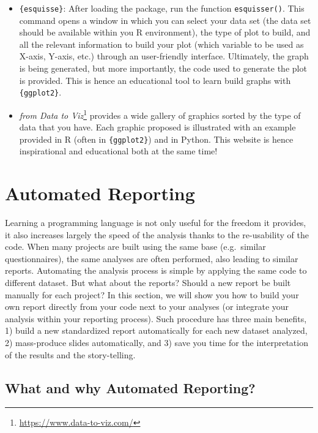\documentclass[
]{krantz}
\providecommand{\tightlist}{%
  \setlength{\itemsep}{0pt}\setlength{\parskip}{0pt}}
\renewenvironment{quote}{\begin{VF}}{\end{VF}}
\renewcommand{\href}[2]{#2\footnote{\url{#1}}}
\begin{document}
\begin{itemize}
\tightlist
\item
  \texttt{\{esquisse\}}: After loading the package, run the function \texttt{esquisser()}. This command opens a window in which you can select your data set (the data set should be available within you R environment), the type of plot to build, and all the relevant information to build your plot (which variable to be used as X-axis, Y-axis, etc.) through an user-friendly interface. Ultimately, the graph is being generated, but more importantly, the code used to generate the plot is provided. This is hence an educational tool to learn build graphs with \texttt{\{ggplot2\}}.
\item
  \href{https://www.data-to-viz.com/}{\emph{from Data to Viz}} provides a wide gallery of graphics sorted by the type of data that you have. Each graphic proposed is illustrated with an example provided in R (often in \texttt{\{ggplot2\}}) and in Python. This website is hence inspirational and educational both at the same time!
\end{itemize}

\hypertarget{auto-report}{%
\chapter{Automated Reporting}\label{auto-report}}

\begin{quote}
Learning a programming language is not only useful for the freedom it provides, it also increases largely the speed of the analysis thanks to the re-usability of the code. When many projects are built using the same base (e.g.~similar questionnaires), the same analyses are often performed, also leading to similar reports. Automating the analysis process is simple by applying the same code to different dataset. But what about the reports? Should a new report be built manually for each project?
In this section, we will show you how to build your own report directly from your code next to your analyses (or integrate your analysis within your reporting process). Such procedure has three main benefits, 1) build a new standardized report automatically for each new dataset analyzed, 2) mass-produce slides automatically, and 3) save you time for the interpretation of the results and the story-telling.
\end{quote}

\hypertarget{what-and-why-automated-reporting}{%
\section{What and why Automated Reporting?}\label{what-and-why-automated-reporting}}
\end{document}
